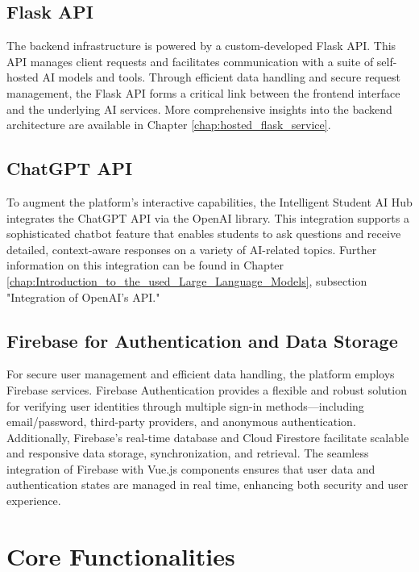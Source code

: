 \subsection{Flask API}

The backend infrastructure is powered by a custom-developed Flask API. This API manages client requests and facilitates communication with a suite of self-hosted AI models and tools. Through efficient data handling and secure request management, the Flask API forms a critical link between the frontend interface and the underlying AI services. More comprehensive insights into the backend architecture are available in Chapter \ref{chap:hosted_flask_service}.

\subsection{ChatGPT API}

To augment the platform's interactive capabilities, the Intelligent Student AI Hub integrates the ChatGPT API via the OpenAI library. This integration supports a sophisticated chatbot feature that enables students to ask questions and receive detailed, context-aware responses on a variety of AI-related topics. Further information on this integration can be found in Chapter \ref{chap:Introduction_to_the_used_Large_Language_Models}, subsection "Integration of OpenAI's API."

\subsection{Firebase for Authentication and Data Storage}

For secure user management and efficient data handling, the platform employs Firebase services. 
Firebase Authentication provides a flexible and robust solution for verifying user identities through multiple sign-in methods—including email/password, 
third-party providers, and anonymous authentication. Additionally, Firebase’s real-time database and Cloud Firestore facilitate scalable and responsive data storage, 
synchronization, and retrieval. The seamless integration of Firebase with Vue.js components ensures that user data and authentication states are managed in real time, 
enhancing both security and user experience.

\cite{Firebase-features}


\section{Core Functionalities}

